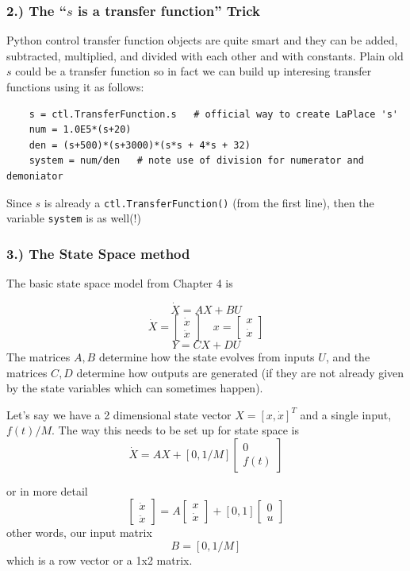 \subsubsection{2.) The ``$s$ is a transfer function'' Trick}
Python control transfer function objects are quite smart and they can be added,
subtracted, multiplied, and divided with each other and with constants.
Plain old $s$ could be a transfer function so in fact we can build up interesing
transfer functions using it as follows:
\begin{verbatim}
    s = ctl.TransferFunction.s   # official way to create LaPlace 's'
    num = 1.0E5*(s+20)
    den = (s+500)*(s+3000)*(s*s + 4*s + 32)
    system = num/den   # note use of division for numerator and demoniator
\end{verbatim}
Since $s$ is already a {\tt ctl.TransferFunction()}  (from the first line), then
the variable {\tt system} is as well(!)

\subsubsection{3.) The State Space method}
The basic state space model from Chapter 4 is


\[
\dot{X} = AX+BU
\]
\[
\dot{X} = \begin{bmatrix}\dot{x} \\ \ddot{x} \end{bmatrix} \quad
x = \begin{bmatrix} x \\ \dot{x}  \end{bmatrix}
\]
\[
Y = CX+DU
\]
The matrices $A,B$ determine how the state evolves from inputs $U$, and
the matrices $C,D$ determine how outputs are generated (if they are not
already given by the state variables which can sometimes happen).

Let's say we have a 2 dimensional state vector $X=[x,\dot{x}]^T$ and
a single input, $f(t)/M$. The way this needs to be set up for state
space is
\[
\dot{X} = AX + [0,1/M]\begin{bmatrix} 0 \\f(t) \end{bmatrix}
\]

or in more detail
\[
\begin{bmatrix}\dot{x}\\ \ddot{x}\end{bmatrix} = A\begin{bmatrix}x\\ \dot{x}\end{bmatrix} + [0,1]\begin{bmatrix} 0\\u \end{bmatrix}
\]
other words, our input matrix
\[
B = [0,1/M]
\]
which is a row vector or a 1x2 matrix.


